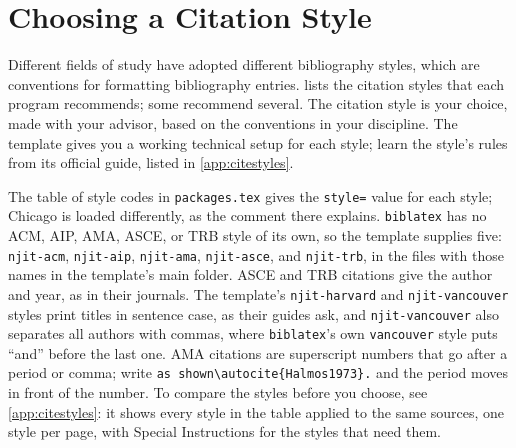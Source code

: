 \section{Choosing a Citation Style}
\label{sec:citestyles}

Different fields of study have adopted different bibliography styles, which are conventions for formatting bibliography entries.  lists the citation styles that each program recommends; some recommend several. The citation style is your choice, made with your advisor, based on the conventions in your discipline. The template gives you a working technical setup for each style; learn the style's rules from its official guide, listed in \cref{app:citestyles}.

The table of style codes in \texttt{packages.tex} gives the \texttt{style=} value for each style; Chicago is loaded differently, as the comment there explains. \texttt{biblatex} has no ACM, AIP, AMA, ASCE, or TRB style of its own, so the template supplies five: \texttt{njit-acm}, \texttt{njit-aip}, \texttt{njit-ama}, \texttt{njit-asce}, and \texttt{njit-trb}, in the files with those names in the template's main folder. ASCE and TRB citations give the author and year, as in their journals. The template's \texttt{njit-harvard} and \texttt{njit-vancouver} styles print titles in sentence case, as their guides ask, and \texttt{njit-vancouver} also separates all authors with commas, where \texttt{biblatex}'s own \texttt{vancouver} style puts ``and'' before the last one. AMA citations are superscript numbers that go after a period or comma; write \verb+as shown\autocite{Halmos1973}.+ and the period moves in front of the number. To compare the styles before you choose, see \cref{app:citestyles}: it shows every style in the table applied to the same sources, one style per page, with Special Instructions for the styles that need them.

